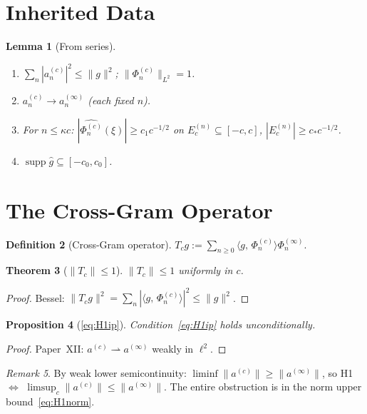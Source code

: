 \documentclass[12pt,a4paper]{amsart}
\newtheorem{theorem}{Theorem}[section]
\newtheorem{lemma}[theorem]{Lemma}
\newtheorem{proposition}[theorem]{Proposition}
\theoremstyle{definition}
\newtheorem{definition}[theorem]{Definition}
\theoremstyle{remark}
\newtheorem{remark}[theorem]{Remark}
\newcommand{\norm}[1]{\|#1\|}
\newcommand{\ip}[2]{\langle #1,\, #2\rangle}
\newcommand{\Phiinf}[1]{\Phi_{#1}^{(\infty)}}
\newcommand{\Phic}[2]{\Phi_{#2}^{(#1)}}
\begin{document}
\section{Inherited Data}
\label{sec:input}

\begin{lemma}[From series]
\label{lem:inherited}
\begin{enumerate}[\rm(A)]
\item $\sum_n|a_n^{(c)}|^2\le\norm{g}^2$;
  $\norm{\Phic{c}{n}}_{L^2}=1$.
\item $a_n^{(c)}\to a_n^{(\infty)}$ (each fixed $n$).
\item For $n\le\kappa c$:
  $|\widehat{\Phi_n^{(c)}}(\xi)|\ge c_1 c^{-1/2}$
  on $E_c^{(n)}\subseteq[-c,c]$,
  $|E_c^{(n)}|\ge c_* c^{-1/2}$.
\item $\operatorname{supp}\hat g\subseteq[-c_0,c_0]$.
\end{enumerate}
\end{lemma}

\section{The Cross-Gram Operator}
\label{sec:crossgram}

\begin{definition}[Cross-Gram operator]
$T_c g:=\sum_{n\ge 0}\ip{g}{\Phic{c}{n}}\Phiinf{n}.$
\end{definition}

\begin{theorem}[$\norm{T_c}\le 1$]
\label{prop:Tc-bounded}
$\norm{T_c}\le 1$ uniformly in $c$.
\end{theorem}
\begin{proof}
Bessel:
$\norm{T_c g}^2=\sum_n|\ip{g}{\Phic{c}{n}}|^2
\le\norm{g}^2$.
\end{proof}

\begin{proposition}[\eqref{eq:H1ip}]
\label{prop:H1ip}
Condition~\eqref{eq:H1ip} holds unconditionally.
\end{proposition}
\begin{proof}
Paper~XII: $a^{(c)}\rightharpoonup a^{(\infty)}$
weakly in $\ell^2$.
\end{proof}

\begin{remark}
By weak lower semicontinuity:
$\liminf\norm{a^{(c)}}\ge\norm{a^{(\infty)}}$,
so H1 $\Leftrightarrow$
$\limsup_c\norm{a^{(c)}}\le\norm{a^{(\infty)}}$.
The entire obstruction is in the norm
upper bound~\eqref{eq:H1norm}.
\end{remark}
\end{document}

